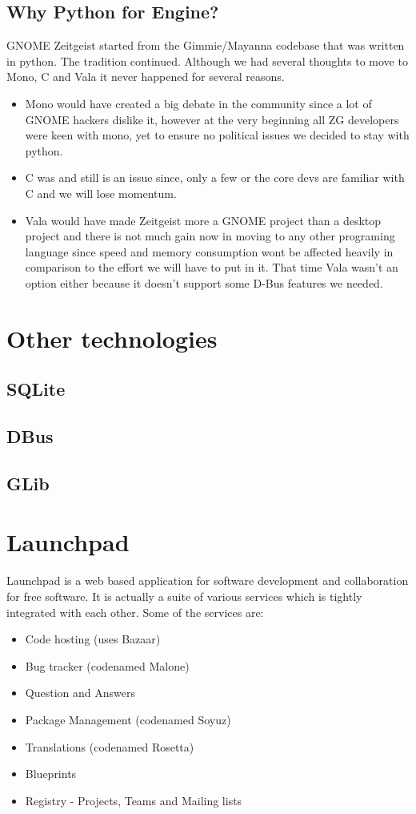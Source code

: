 \subsection{Why Python for Engine?}
GNOME Zeitgeist started from the Gimmie/Mayanna codebase that was written 
in python. The tradition continued. Although we had several thoughts to move 
to Mono, C and Vala it never happened for several reasons. 
\begin{itemize}
\item Mono would have created a big debate in the community since a lot of 
GNOME hackers dislike it, however at the very beginning all ZG developers were 
keen with mono, yet to ensure no political issues we decided to stay with python.
\item C was and still is an issue since, only a few or the core devs are familiar 
with C and we will lose momentum.
\item Vala would have made Zeitgeist more a GNOME project than a desktop project 
and there is not much gain now in moving to any other programing language since 
speed and memory consumption wont be affected heavily in comparison to the effort 
we will have to put in it. That time Vala wasn't an option either because it 
doesn't support some D-Bus features we needed.
\end{itemize}


\section{Other technologies}
\subsection{SQLite}
\subsection{DBus}
\subsection{GLib}

\section{Launchpad}

Launchpad is a web based application for software development and collaboration for 
free software. It is actually a suite of various services which is tightly integrated 
with each other. Some of the services are:
\begin{itemize}
\item Code hosting (uses Bazaar)
\item Bug tracker (codenamed Malone)
\item Question and Answers
\item Package Management (codenamed Soyuz)
\item Translations (codenamed Rosetta)
\item Blueprints
\item Registry - Projects, Teams and Mailing lists
\end{itemize}

